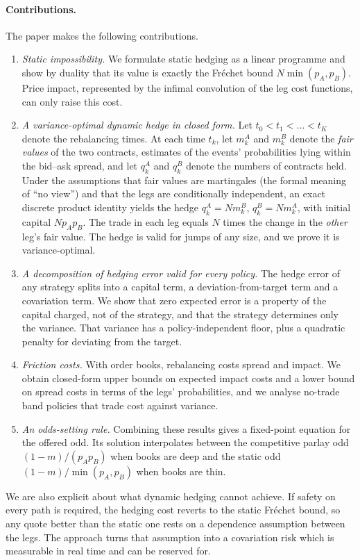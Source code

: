 \documentclass[11pt,a4paper]{article}
\theoremstyle{plain}
\theoremstyle{definition}
\theoremstyle{remark}
\newcommand{\1}{\mathbf{1}}
\begin{document}
\paragraph{Contributions.}
The paper makes the following contributions.
\begin{enumerate}[label=(\arabic*)]
  \item \emph{Static impossibility.} We formulate static hedging as a linear programme and show by duality that its value is exactly the Fréchet bound $N\min(p_A,p_B)$. Price impact, represented by the infimal convolution of the leg cost functions, can only raise this cost.
  \item \emph{A variance-optimal dynamic hedge in closed form.} Let $t_0<t_1<\dots<t_K$ denote the rebalancing times. At each time $t_k$, let $m^A_k$ and $m^B_k$ denote the \emph{fair values} of the two contracts, estimates of the events' probabilities lying within the bid--ask spread, and let $q^A_k$ and $q^B_k$ denote the numbers of contracts held. Under the assumptions that fair values are martingales (the formal meaning of ``no view'') and that the legs are conditionally independent, an exact discrete product identity yields the hedge $q^A_k = N m^B_k$, $q^B_k = N m^A_k$, with initial capital $N p_A p_B$. The trade in each leg equals $N$ times the change in the \emph{other} leg's fair value. The hedge is valid for jumps of any size, and we prove it is variance-optimal.
  \item \emph{A decomposition of hedging error valid for every policy.} The hedge error of any strategy splits into a capital term, a deviation-from-target term and a covariation term. We show that zero expected error is a property of the capital charged, not of the strategy, and that the strategy determines only the variance. That variance has a policy-independent floor, plus a quadratic penalty for deviating from the target.
  \item \emph{Friction costs.} With order books, rebalancing costs spread and impact. We obtain closed-form upper bounds on expected impact costs and a lower bound on spread costs in terms of the legs' probabilities, and we analyse no-trade band policies that trade cost against variance.
  \item \emph{An odds-setting rule.} Combining these results gives a fixed-point equation for the offered odd. Its solution interpolates between the competitive parlay odd $(1-m)/(p_A p_B)$ when books are deep and the static odd $(1-m)/\min(p_A,p_B)$ when books are thin.
\end{enumerate}
We are also explicit about what dynamic hedging cannot achieve. If safety on every path is required, the hedging cost reverts to the static Fréchet bound, so any quote better than the static one rests on a dependence assumption between the legs. The approach turns that assumption into a covariation risk which is measurable in real time and can be reserved for.
\end{document}
